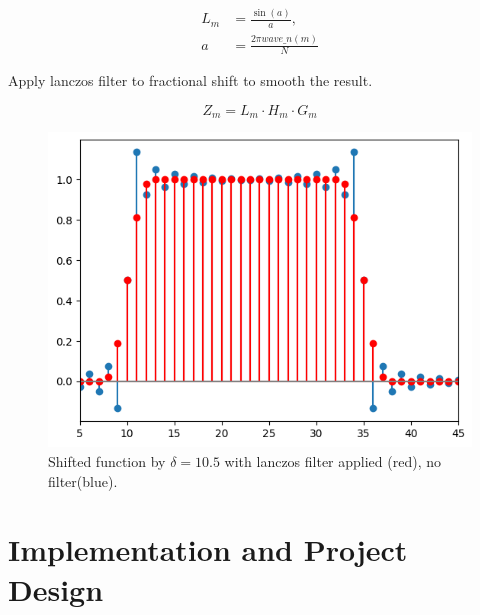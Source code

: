 \documentclass[]{usiinfbachelorproject}
\begin{document}
	\begin{align*}
		L_m &= \frac{\sin(a)}{a},\\
		a &= \frac{2\pi wave\_n(m)}{N}
	\end{align*}
	
	Apply lanczos filter to fractional shift to smooth the result.
	
	\begin{equation*}
		Z_m = L_m \cdot H_m \cdot G_m
	\end{equation*}
	
	\begin{figure}[h]
		\centering
		\includegraphics[width=0.5\columnwidth]{images/box_shifted_lanczos_delta10_1_n50.png}
		\caption{Shifted function by $\delta=10.5$ with lanczos filter applied (red), no filter(blue).}
	\end{figure}
	
	\fi
	
	
	\section{Implementation and Project Design}
	
	
\end{document}
